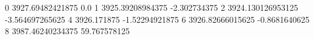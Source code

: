 0 3927.69482421875 0.0
1 3925.39208984375 -2.302734375
2 3924.130126953125 -3.564697265625
4 3926.171875 -1.52294921875
6 3926.82666015625 -0.8681640625
8 3987.46240234375 59.767578125
